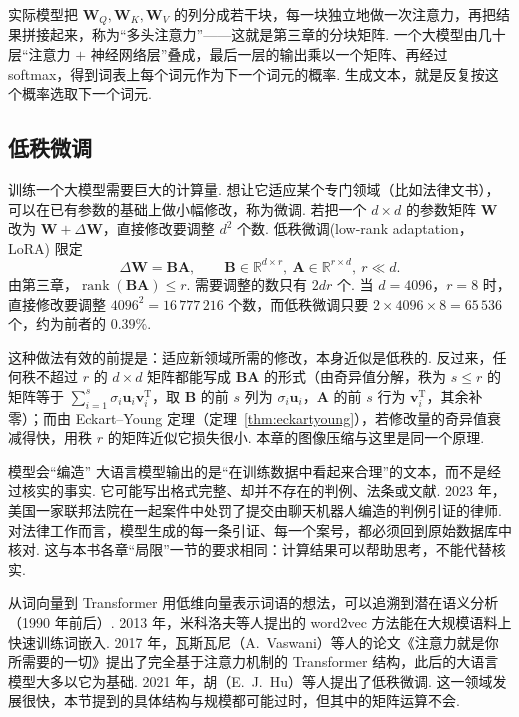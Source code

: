 \documentclass[lang=cn,10.5pt,scheme=chinese,toc=twocol,section,chinesefont=nofont,
twoside,citestyle=gb7714-2015,bibstyle=gb7714-2015]{elegantbook}
\DeclareRobustCommand{\textbf}[1]{{\lnsemiboldlatin\lnsemiboldcjk #1}}
\newcommand{\vv}[1]{\boldsymbol{#1}}
\newcommand{\trans}{\mathrm{T}}             %
\numberwithin{equation}{section}   %
\newcommand{\rk}{\operatorname{rank}}       %
\begin{document}
实际模型把 $\vv W_Q,\vv W_K,\vv W_V$ 的列分成若干块，每一块独立地做一次注意力，再把结果拼接起来，称为“多头注意力”——这就是第三章的分块矩阵. 一个大模型由几十层“注意力 $+$ 神经网络层”叠成，最后一层的输出乘以一个矩阵、再经过 softmax，得到词表上每个词元作为下一个词元的概率. 生成文本，就是反复按这个概率选取下一个词元.

\subsection{低秩微调}

训练一个大模型需要巨大的计算量. 想让它适应某个专门领域（比如法律文书），可以在已有参数的基础上做小幅修改，称为微调. 若把一个 $d\times d$ 的参数矩阵 $\vv W$ 改为 $\vv W+\Delta\vv W$，直接修改要调整 $d^2$ 个数. \textbf{低秩微调}(low-rank adaptation，LoRA)\cite{hu2022lora} 限定
\[
  \Delta\vv W=\vv B\vv A,\qquad \vv B\in\mathbb{R}^{d\times r},\ \vv A\in\mathbb{R}^{r\times d},\ r\ll d.
\]
由第三章，$\rk(\vv B\vv A)\le r$. 需要调整的数只有 $2dr$ 个. 当 $d=4096$，$r=8$ 时，直接修改要调整 $4096^2=16\,777\,216$ 个数，而低秩微调只要 $2\times4096\times8=65\,536$ 个，约为前者的 $0.39\%$.

这种做法有效的前提是：适应新领域所需的修改，本身近似是低秩的. 反过来，任何秩不超过 $r$ 的 $d\times d$ 矩阵都能写成 $\vv B\vv A$ 的形式（由奇异值分解，秩为 $s\le r$ 的矩阵等于 $\sum_{i=1}^{s}\sigma_i\vv u_i\vv v_i^\trans$，取 $\vv B$ 的前 $s$ 列为 $\sigma_i\vv u_i$，$\vv A$ 的前 $s$ 行为 $\vv v_i^\trans$，其余补零）；而由 Eckart–Young 定理（定理~\ref{thm:eckartyoung}），若修改量的奇异值衰减得快，用秩 $r$ 的矩阵近似它损失很小. 本章的图像压缩与这里是同一个原理.

\begin{linkbox}{模型会“编造”}
  大语言模型输出的是“在训练数据中看起来合理”的文本，而不是经过核实的事实. 它可能写出格式完整、却并不存在的判例、法条或文献. 2023 年，美国一家联邦法院在一起案件中处罚了提交由聊天机器人编造的判例引证的律师. 对法律工作而言，模型生成的每一条引证、每一个案号，都必须回到原始数据库中核对. 这与本书各章“局限”一节的要求相同：计算结果可以帮助思考，不能代替核实.
\end{linkbox}

\begin{historybox}{从词向量到 Transformer}
  用低维向量表示词语的想法，可以追溯到潜在语义分析（1990 年前后）. 2013 年，米科洛夫等人提出的 word2vec 方法能在大规模语料上快速训练词嵌入\cite{mikolov2013linguistic}. 2017 年，瓦斯瓦尼（A.~Vaswani）等人的论文《注意力就是你所需要的一切》提出了完全基于注意力机制的 Transformer 结构\cite{vaswani2017attention}，此后的大语言模型大多以它为基础. 2021 年，胡（E.~J.~Hu）等人提出了低秩微调\cite{hu2022lora}. 这一领域发展很快，本节提到的具体结构与规模都可能过时，但其中的矩阵运算不会.
\end{historybox}
\end{document}
